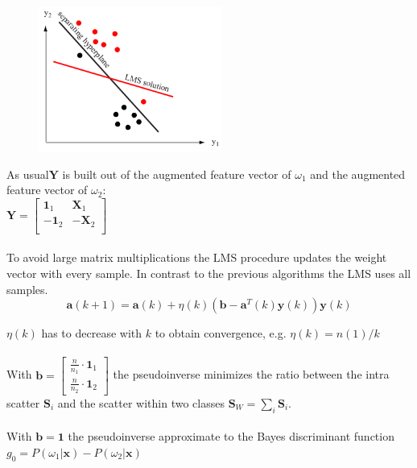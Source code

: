     \begin{figure}
        \includegraphics[width=6cm]{./images/LMS.png}
    \end{figure}
    
     As usual$\bm Y$ is built out of the augmented feature vector of $\omega_1$ and the augmented feature vector of $\omega_2$:\\
    $\bm Y = \begin{bmatrix}
    \bm 1_1 & \bm X_1 \\
    - \bm 1_2 & -\bm X_2  \\
    \end{bmatrix}$ \\
    
    \\
    To avoid large matrix multiplications the LMS procedure updates the weight vector with every sample. 
    In contrast to the previous algorithms the LMS uses all samples.
    \begin{equation*}
        \bm a(k+1)=\bm a(k)+\eta(k)\left(\bm b-\bm a^T(k)\bm y(k)\right)\bm y(k)
    \end{equation*}
    
    $\eta(k)$ has to decrease with $k$ to obtain convergence, e.g. $\eta(k)=n(1)/k$\\

    \\
        With $\bm b=\begin{bmatrix}
        \frac{n}{n_1} \cdot \bm 1_1\\
        \frac{n}{n_2} \cdot \bm 1_2
        \end{bmatrix}$ the pseudoinverse minimizes the ratio between the intra scatter $\bm S_i$ and the
        scatter within two classes $\bm S_W = \sum_i \bm S_i$.\\
        
    \\
    With  $\bm b=\bm 1$ the pseudoinverse approximate to the Bayes discriminant function $g_0 = P(\omega_1 | \bm x) - P(\omega_2 | \bm x)$\\

